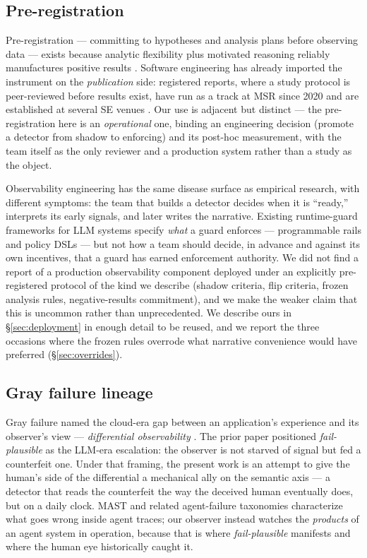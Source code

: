 \documentclass[11pt]{article}
\newcommand{\failplausible}{\emph{fail-plausible}}
\begin{document}
\subsection{Pre-registration}
\label{sec:prereg}

Pre-registration --- committing to hypotheses and analysis plans before
observing data --- exists because analytic flexibility plus motivated
reasoning reliably manufactures positive results \cite{nosek2018prereg}.
Software engineering has already imported the instrument on the
\emph{publication} side: registered reports, where a study protocol is
peer-reviewed before results exist, have run as a track at MSR since
2020 and are established at several SE venues \cite{ernst2023rr}. Our
use is adjacent but distinct --- the pre-registration here is an
\emph{operational} one, binding an engineering decision (promote a
detector from shadow to enforcing) and its post-hoc measurement, with
the team itself as the only reviewer and a production system rather
than a study as the object.

Observability engineering has the same disease surface as empirical
research, with different symptoms: the team that builds a detector
decides when it is ``ready,'' interprets its early signals, and later
writes the narrative. Existing runtime-guard frameworks for LLM systems
specify \emph{what} a guard enforces --- programmable rails and policy
DSLs \cite{rebedea2023nemo} --- but not how a team should decide, in
advance and against its own incentives, that a guard has earned
enforcement authority. We did not find a report of a production
observability component deployed under an explicitly pre-registered
protocol of the kind we describe (shadow criteria, flip criteria,
frozen analysis rules, negative-results commitment), and we make the
weaker claim that this is uncommon rather than unprecedented. We
describe ours in \S\ref{sec:deployment} in enough detail to be reused,
and we report the three occasions where the frozen rules overrode what
narrative convenience would have preferred (\S\ref{sec:overrides}).

\subsection{Gray failure lineage}

Gray failure named the cloud-era gap between an application's
experience and its observer's view --- \emph{differential observability}
\cite{huang2017gray}. The prior paper positioned \failplausible{} as
the LLM-era escalation: the observer is not starved of signal but fed a
counterfeit one. Under that framing, the present work is an attempt to
give the human's side of the differential a mechanical ally on the
semantic axis --- a detector that reads the counterfeit the way the
deceived human eventually does, but on a daily clock. MAST
\cite{cemri2025mast} and related agent-failure taxonomies characterize
what goes wrong inside agent traces; our observer instead watches the
\emph{products} of an agent system in operation, because that is where
\failplausible{} manifests and where the human eye historically caught
it.
\end{document}
